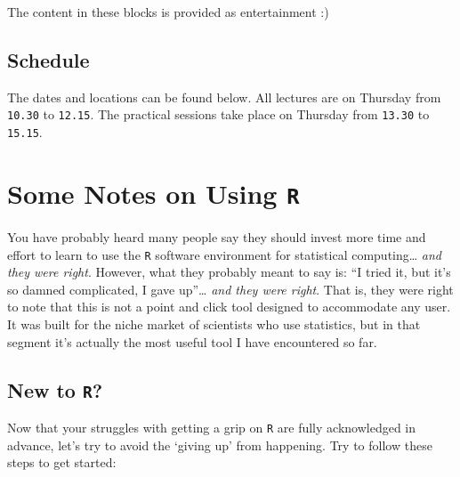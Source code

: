 \documentclass[12pt,]{book}
\let\stdsection\section
\renewcommand\section{\newpage\stdsection}
\let\BeginKnitrBlock\begin \let\EndKnitrBlock\end
\begin{document}
\BeginKnitrBlock{rmdentertain}
The content in these blocks is provided as entertainment :)
\EndKnitrBlock{rmdentertain}

\hypertarget{schedule}{%
\section*{\texorpdfstring{\textbf{Schedule}}{Schedule}}\label{schedule}}

The dates and locations can be found below. All lectures are on Thursday from \texttt{10.30} to \texttt{12.15}. The practical sessions take place on Thursday from \texttt{13.30} to \texttt{15.15}.

\hypertarget{some-notes-on-using-r}{%
\chapter*{\texorpdfstring{\textbf{Some Notes on Using \texttt{R}}}{Some Notes on Using R}}\label{some-notes-on-using-r}}

You have probably heard many people say they should invest more time and effort to learn to use the \texttt{R} software environment for statistical computing\ldots{} \emph{and they were right}. However, what they probably meant to say is: ``I tried it, but it's so damned complicated, I gave up''\ldots{} \emph{and they were right}. That is, they were right to note that this is not a point and click tool designed to accommodate any user. It was built for the niche market of scientists who use statistics, but in that segment it's actually the most useful tool I have encountered so far.

\hypertarget{new-to-r}{%
\section*{\texorpdfstring{\textbf{New to \texttt{R}?}}{New to R?}}\label{new-to-r}}

Now that your struggles with getting a grip on \texttt{R} are fully acknowledged in advance, let's try to avoid the `giving up' from happening. Try to follow these steps to get started:
\end{document}
